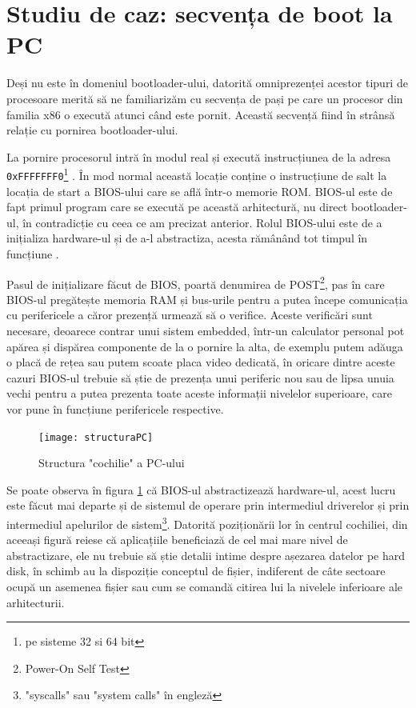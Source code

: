 \documentclass[12pt,a4paper,titlepage]{report}
\begin{document}
\section{Studiu de caz: secvența de boot la PC}
Deși nu este în domeniul bootloader-ului, datorită omniprezenței acestor tipuri de procesoare merită să ne familiarizăm cu secvența de pași pe care un procesor din familia x86 o execută atunci când este pornit.
Această secvență fiind în strânsă relație cu pornirea bootloader-ului.

La pornire procesorul intră în modul real și execută instrucțiunea de la adresa \texttt{0xFFFFFFF0}\footnote{pe sisteme 32 si 64 bit} \cite{intel80386} \cite{intel64}. În mod normal această locație conține o instrucțiune de salt la locația de start a BIOS-ului care se află într-o memorie ROM.
BIOS-ul este de fapt primul program care se execută pe această arhitectură, nu direct bootloader-ul, în contradicție cu ceea ce am precizat anterior. Rolul BIOS-ului este de a inițializa hardware-ul și de a-l abstractiza, acesta rămânând tot timpul în funcțiune \cite{wikiBootSeq}.

Pasul de inițializare făcut de BIOS, poartă denumirea de POST\footnote{Power-On Self Test}, pas în care BIOS-ul pregătește memoria RAM și bus-urile pentru a putea începe comunicația cu perifericele a căror prezență urmează să o verifice. Aceste verificări sunt necesare, deoarece contrar unui sistem embedded, într-un calculator personal pot apărea și dispărea componente de la o pornire la alta, de exemplu putem adăuga o placă de rețea sau putem scoate placa video dedicată, în oricare dintre aceste cazuri BIOS-ul trebuie să știe de prezența unui periferic nou sau de lipsa unuia vechi pentru a putea prezenta toate aceste informații nivelelor superioare, care vor pune în funcțiune perifericele respective.
\begin{figure}[h]
    \centering
    \texttt{[image: structuraPC]}
    \caption{Structura "cochilie" a PC-ului}
    \label{shellArchitecture}
\end{figure}
Se poate observa în figura \ref{shellArchitecture} că BIOS-ul abstractizează hardware-ul, acest lucru este făcut mai departe și de sistemul de operare prin intermediul driverelor și prin intermediul apelurilor de sistem\footnote{"syscalls" sau "system calls" în engleză}. Datorită poziționării lor în centrul cochiliei, din aceeași figură reiese că aplicațiile beneficiază de cel mai mare nivel de abstractizare, ele nu trebuie să știe detalii intime despre așezarea datelor pe hard disk, în schimb au la dispoziție conceptul de fișier, indiferent de câte sectoare ocupă un asemenea fișier sau cum se comandă citirea lui la nivelele inferioare ale arhitecturii.
\end{document}
